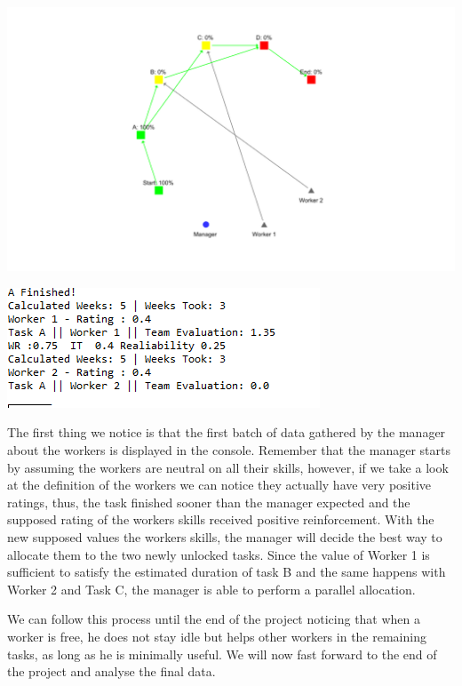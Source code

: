 \documentclass[paper=a4, fontsize=11pt]{scrartcl} %
\numberwithin{equation}{section} %
\numberwithin{figure}{section} %
\numberwithin{table}{section} %
\begin{document}
\includegraphics[scale=0.3]{exp2.png}
\begin{center}
	\includegraphics[scale=1]{data1.png}
\end{center}
The first thing we notice is that the first batch of data gathered by the manager about the workers is displayed in the console. Remember that the manager starts by assuming the workers are neutral on all their skills, however, if we take a look at the definition of the workers we can notice they actually have very positive ratings, thus, the task finished sooner than the manager expected and the supposed rating of the workers skills received positive reinforcement.
With the new supposed values the workers skills, the manager will decide the best way to allocate them to the two newly unlocked tasks. Since the value of Worker 1 is sufficient to satisfy the estimated duration of task B and the same happens with Worker 2 and Task C, the manager is able to perform a parallel allocation.

We can follow this process until the end of the project noticing that when a worker is free, he does not stay idle but helps other workers in the remaining tasks, as long as he is minimally useful. We will now fast forward to the end of the project and analyse the final data.
\end{document}
